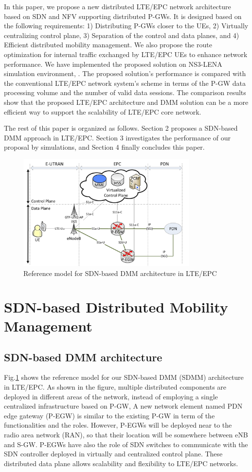 \documentclass[runningheads,a4paper]{llncs}
\begin{document}
In this paper, we propose a new distributed LTE/EPC network architecture based on SDN and NFV supporting distributed P-GWs. It is designed based on the following requirements: 1) Distributing P-GWs closer to the UEs, 2) Virtually centralizing control plane, 3) Separation of the control and data planes, and 4) Efficient distributed mobility management. We also propose the route optimization for internal traffic exchanged by LTE/EPC UEs to enhance network performance. We have implemented the proposed solution on NS3-LENA simulation environment, \cite{ref13,ref13-1}. The proposed solution's performance is compared with the conventional LTE/EPC network system's scheme in terms of the P-GW data processing volume and the number of valid data sessions. The comparison results show that the proposed LTE/EPC architecture and DMM solution can be a more efficient way to support the scalability of LTE/EPC core network.

The rest of this paper is organized as follows. Section 2 proposes a SDN-based DMM approach in LTE/EPC. Section 3 investigates the performance of our proposal by simulations, and Section 4 finally concludes this paper.

\begin{figure}[t]
\begin{center}
\includegraphics[width=9cm]{figures/fig1.pdf}
\end{center}
\caption{Reference model for SDN-based DMM architecture in LTE/EPC}
\label{fig:f1}
\end{figure}


\section{SDN-based Distributed Mobility Management}
\subsection{SDN-based DMM architecture}
Fig.\ref{fig:f1} shows the reference model for our SDN-based DMM (SDMM) architecture in LTE/EPC. As shown in the figure, multiple distributed components are deployed in different areas of the network, instead of employing a single centralized infrastructure based on P-GW,  A new network element named PDN edge gateway (P-EGW) is similar to the existing P-GW in term of the functionalities and the roles. However, P-EGWs will be deployed near to the radio area network (RAN), so that their location will be somewhere between eNB and S-GW. P-EGWs have also the role of SDN switches to communicate with the SDN controller deployed in virtually and centralized control plane. These distributed data plane allows scalability and flexibility to LTE/EPC networks.
\end{document}
